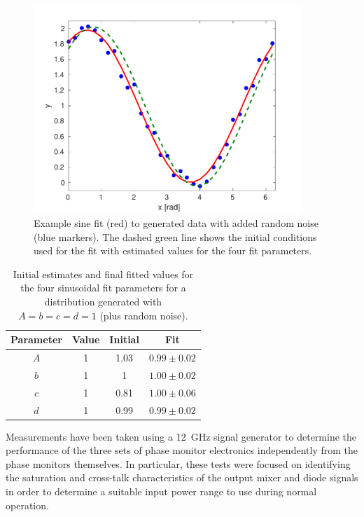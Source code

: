 \begin{figure}
  \centering
  \includegraphics[width=0.9\textwidth]{Figures/phaseMons/sinFitEx}
  \caption{Example sine fit (red) to generated data with added random noise (blue markers). The dashed green line shows the initial conditions used for the fit with estimated values for the four fit parameters.}
  \label{f:sinFitEx}
\end{figure}

\begin{table}
  \begin{center}
    \begin{tabular}{|c c c c|}
	   \hline
       Parameter & Value & Initial & Fit \\ \hline
       \(A\) & 1 & 1.03 & \(0.99\pm0.02\)\\
       \(b\) & 1 & 1 & \(1.00\pm0.02\) \\
       \(c\) & 1 & 0.81 & \(1.00\pm0.06\) \\
       \(d\) & 1 & 0.99 & \(0.99\pm0.02\) \\ \hline
    \end{tabular}
    \caption{Initial estimates and final fitted values for the four sinusoidal fit parameters for a distribution generated with \(A = b = c = d = 1\) (plus random noise).}
  	\label{t:sinFitEx}
  \end{center}
\end{table}


Measurements have been taken using a 12~GHz signal generator to determine the performance of the three sets of phase monitor electronics independently from the phase monitors themselves. In particular, these tests were focused on identifying the saturation and cross-talk characteristics of the output mixer and diode signals in order to determine a suitable input power range to use during normal operation.

